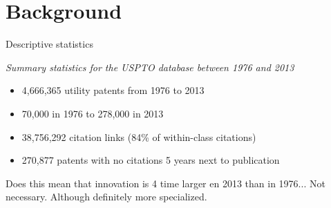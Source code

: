 \documentclass{beamer}
\begin{document}
\section{Background}

    
\begin{frame}{Descriptive statistics}
    
    
    \textit{Summary statistics for the USPTO database between 1976 and 2013}
    
    \begin{itemize}
        \item 4,666,365 utility patents from 1976 to 2013
        \item 70,000 in 1976 to 278,000 in 2013
        \item 38,756,292 citation links (84\% of within-class citations)
        \item 270,877 patents with no citations 5 years next to publication
    \end{itemize}
    
    Does this mean that innovation is 4 time larger en 2013 than in 1976... \alert{Not necessary}. Although definitely more specialized.
\end{frame}
\end{document}
